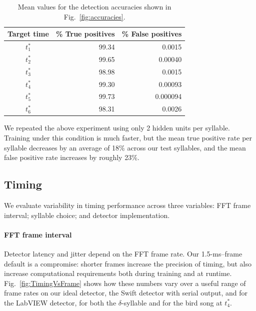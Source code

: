 \documentclass[10pt,letterpaper]{article}
\newcommand\fig[1]{Fig.~\ref{#1}}
\renewcommand{\subsubsection}[1]{\paragraph{#1}}
\begin{document}
\begin{table}
  \begin{tabular}{c|rr}
    Target time & \% True positives & \% False positives \\ \hline
    $t^*_1$ & 99.34 &  0.0015 \\
    $t^*_2$ & 99.65 &  0.00040 \\
    $t^*_3$ & 98.98 &  0.0015 \\
    $t^*_4$ & 99.30 &  0.00093 \\
    $t^*_5$ & 99.73 &  0.000094 \\
    $t^*_6$ & 98.31 &  0.0026
  \end{tabular}
  \caption{Mean values for the detection accuracies shown in \fig{fig:accuracies}.}
  \label{table:accuracies}
\end{table}
  

We repeated the above experiment using only 2 hidden units per syllable.  Training under this condition is much faster, but the mean true positive rate per syllable decreases by an average of 18\% across our test syllables, and the mean false positive rate increases by roughly 23\%.

\subsection{Timing}

We evaluate variability in timing performance across three variables:
FFT frame interval; syllable choice; and detector implementation.

\subsubsection{FFT frame interval}

Detector latency and jitter depend on the FFT frame rate.  Our
1.5-ms--frame default is a compromise: shorter frames increase the
precision of timing, but also increase computational requirements both
during training and at runtime.  \fig{fig:TimingVsFrame} shows how
these numbers vary over a useful range of frame rates on our ideal
detector, the Swift detector with serial output, and for the LabVIEW
detector, for both the $\delta$-syllable and for the bird song at
$t^*_4$.
\end{document}
